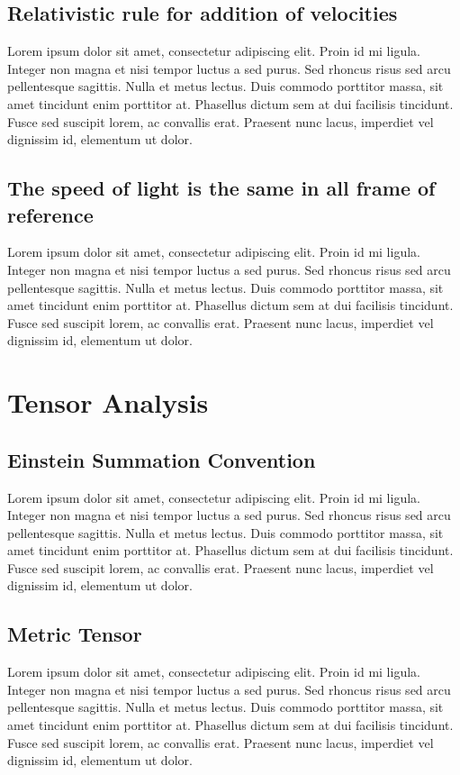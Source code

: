 \documentclass[natbib]{muthesis}
\begin{document}
  \section{Relativistic rule for addition of velocities}

  Lorem ipsum dolor sit amet, consectetur adipiscing elit. Proin id mi ligula. Integer non magna et nisi tempor luctus a sed purus. Sed rhoncus risus sed arcu pellentesque sagittis. Nulla et metus lectus. Duis commodo porttitor massa, sit amet tincidunt enim porttitor at. Phasellus dictum sem at dui facilisis tincidunt. Fusce sed suscipit lorem, ac convallis erat. Praesent nunc lacus, imperdiet vel dignissim id, elementum ut dolor.

  \section{The speed of light is the same in all frame of reference}
  Lorem ipsum dolor sit amet, consectetur adipiscing elit. Proin id mi ligula. Integer non magna et nisi tempor luctus a sed purus. Sed rhoncus risus sed arcu pellentesque sagittis. Nulla et metus lectus. Duis commodo porttitor massa, sit amet tincidunt enim porttitor at. Phasellus dictum sem at dui facilisis tincidunt. Fusce sed suscipit lorem, ac convallis erat. Praesent nunc lacus, imperdiet vel dignissim id, elementum ut dolor.


  \chapter{Tensor Analysis}

  \section{Einstein Summation Convention}
  Lorem ipsum dolor sit amet, consectetur adipiscing elit. Proin id mi ligula. Integer non magna et nisi tempor luctus a sed purus. Sed rhoncus risus sed arcu pellentesque sagittis. Nulla et metus lectus. Duis commodo porttitor massa, sit amet tincidunt enim porttitor at. Phasellus dictum sem at dui facilisis tincidunt. Fusce sed suscipit lorem, ac convallis erat. Praesent nunc lacus, imperdiet vel dignissim id, elementum ut dolor.

  \section{Metric Tensor}
  Lorem ipsum dolor sit amet, consectetur adipiscing elit. Proin id mi ligula. Integer non magna et nisi tempor luctus a sed purus. Sed rhoncus risus sed arcu pellentesque sagittis. Nulla et metus lectus. Duis commodo porttitor massa, sit amet tincidunt enim porttitor at. Phasellus dictum sem at dui facilisis tincidunt. Fusce sed suscipit lorem, ac convallis erat. Praesent nunc lacus, imperdiet vel dignissim id, elementum ut dolor.
\end{document}
